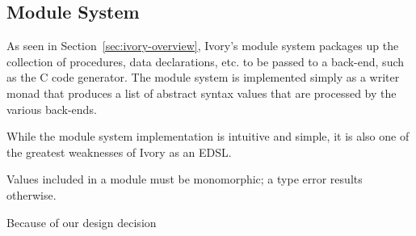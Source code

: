 \subsection{Module System}

As seen in Section~\ref{sec:ivory-overview}, Ivory's module system packages up
the collection of procedures, data declarations, etc. to be passed to a
back-end, such as the C code generator. The module system is implemented simply
as a writer monad that produces a list of abstract syntax values that are
processed by the various back-ends.

While the module system implementation is intuitive and simple, it is also one
of the greatest weaknesses of Ivory as an EDSL. 

Values included in a module must be monomorphic; a type error results
otherwise. 

Because of our design decision 







